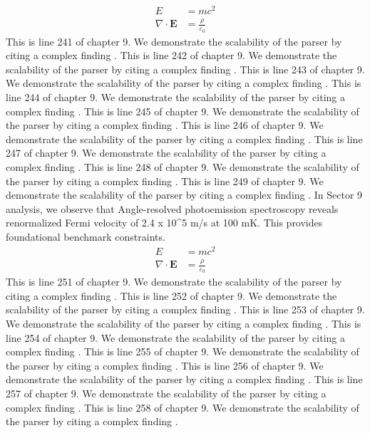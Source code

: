 \begin{align*}
  E &= mc^2 \\
  \nabla \cdot \mathbf{E} &= \frac{\rho}{\varepsilon_0}
\end{align*}
This is line 241 of chapter 9. We demonstrate the scalability of the parser by citing a complex finding \cite{ref9_241}.
This is line 242 of chapter 9. We demonstrate the scalability of the parser by citing a complex finding \cite{ref9_242}.
This is line 243 of chapter 9. We demonstrate the scalability of the parser by citing a complex finding \cite{ref9_243}.
This is line 244 of chapter 9. We demonstrate the scalability of the parser by citing a complex finding \cite{ref9_244}.
This is line 245 of chapter 9. We demonstrate the scalability of the parser by citing a complex finding \cite{ref9_245}.
This is line 246 of chapter 9. We demonstrate the scalability of the parser by citing a complex finding \cite{ref9_246}.
This is line 247 of chapter 9. We demonstrate the scalability of the parser by citing a complex finding \cite{ref9_247}.
This is line 248 of chapter 9. We demonstrate the scalability of the parser by citing a complex finding \cite{ref9_248}.
This is line 249 of chapter 9. We demonstrate the scalability of the parser by citing a complex finding \cite{ref9_249}.
In Sector 9 analysis, we observe that Angle-resolved photoemission spectroscopy reveals renormalized Fermi velocity of 2.4 x 10^5 m/s at 100 mK. This provides foundational benchmark constraints.
\begin{align*}
  E &= mc^2 \\
  \nabla \cdot \mathbf{E} &= \frac{\rho}{\varepsilon_0}
\end{align*}
This is line 251 of chapter 9. We demonstrate the scalability of the parser by citing a complex finding \cite{ref9_251}.
This is line 252 of chapter 9. We demonstrate the scalability of the parser by citing a complex finding \cite{ref9_252}.
This is line 253 of chapter 9. We demonstrate the scalability of the parser by citing a complex finding \cite{ref9_253}.
This is line 254 of chapter 9. We demonstrate the scalability of the parser by citing a complex finding \cite{ref9_254}.
This is line 255 of chapter 9. We demonstrate the scalability of the parser by citing a complex finding \cite{ref9_255}.
This is line 256 of chapter 9. We demonstrate the scalability of the parser by citing a complex finding \cite{ref9_256}.
This is line 257 of chapter 9. We demonstrate the scalability of the parser by citing a complex finding \cite{ref9_257}.
This is line 258 of chapter 9. We demonstrate the scalability of the parser by citing a complex finding \cite{ref9_258}.
